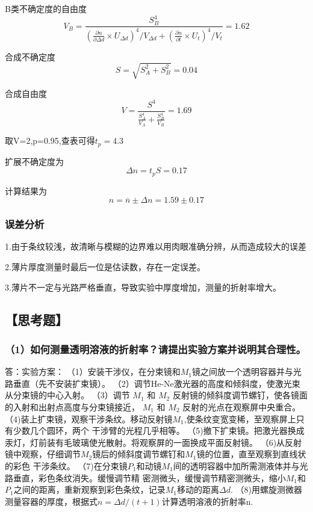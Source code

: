 \documentclass[12pt,a4paper,UTF8]{ctexart}
\begin{document}
B类不确定度的自由度
\begin{equation*}
	V_B=\frac{S_B^4}{{\left( \frac{\partial n}{\partial \varDelta d}\times U_{\varDelta d}\right) }^4/V_{\varDelta d}+{\left( \frac{\partial n}{\partial t}\times U_{t}\right) }^4/V_t}=1.62
\end{equation*}

合成不确定度
\begin{equation*}
	S= \sqrt{S_A^2+S_B^2}=0.04
\end{equation*}

合成自由度
\begin{equation*}
	V=\frac{S^4}{ \frac{S_A^4}{V_A}+ \frac{S_B^4}{V_B}}=1.69
\end{equation*}

取V=2,p=0.95,查表可得$t_p=4.3$

扩展不确定度为
\begin{equation*}
	\varDelta n=t_p S =0.17
\end{equation*}

计算结果为
\begin{equation*}
	n=\overline{n} \pm \varDelta n=1.59\pm0.17
\end{equation*}

\subsubsection*{误差分析}
1.由于条纹较浅，故清晰与模糊的边界难以用肉眼准确分辨，从而造成较大的误差

2.薄片厚度测量时最后一位是估读数，存在一定误差。

3.薄片不一定与光路严格垂直，导致实验中厚度增加，测量的折射率增大。


\newpage
\subsection*{【思考题】}
\subsubsection*{（1）如何测量透明溶液的折射率？请提出实验方案并说明其合理性。}
答：实验方案：
（1）安装干涉仪，在分束镜和$M_1$镜之间放一个透明容器并与光路垂直（先不安装扩束镜）。
（2）调节He-Ne激光器的高度和倾斜度，使激光束从分束镜的中心入射。
（3）调节 $M_1$ 和 $M_2$ 反射镜的倾斜度调节螺钉，使各镜面的入射和出射点高度与分束镜接近， $M_1$ 和 $M_2$
反射的光点在观察屏中央重合。
（4)装上扩束镜，观察干涉条纹。移动反射镜$M_1$,使条纹变宽变稀，至观察屏上只有少数几个圆环，两个
干涉臂的光程几乎相等。
（5)撤下扩束镜。把激光器换成汞灯，灯前装有毛玻璃使光散射。将观察屏的一面换成平面反射镜。
（6)从反射镜中观察，仔细调节$M_2$镜后的倾斜度调节螺钉和$M_1$镜的位置，直至观察到直线状的彩色
干涉条纹。
（7)在分束镜$P_1$和动镜$M_1$间的透明容器中加所需测液体并与光路垂直，彩色条纹消失。缓慢调节精
密测微头，缓慢调节精密测微头，缩小$M_1$和$P_1$之间的距离，重新观察到彩色条纹，记录$M_1$移动的距离$\varDelta d$.
（8)用螺旋测微器测量容器的厚度，根据式$n=\varDelta d/(t+1)$计算透明溶液的折射率n.
\end{document}
